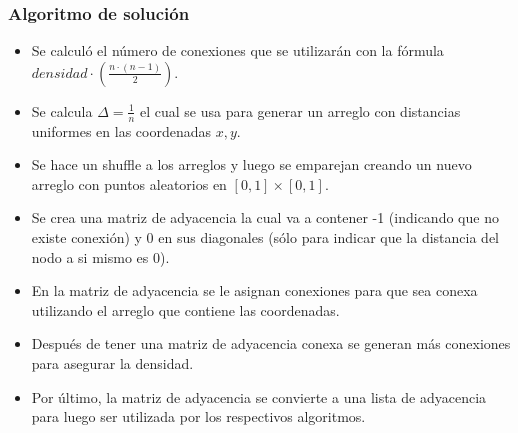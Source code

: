 \documentclass[letterpaper,11pt]{article}
\begin{document}
        \subsubsection{Algoritmo de solución}
            \begin{itemize}
                \item Se calculó el número de conexiones que se utilizarán con la fórmula $densidad \cdot (\frac{n \cdot (n-1)}{2})$.
                \item Se calcula $\Delta = \frac{1}{n}$ el cual se usa para generar un arreglo con distancias uniformes en las coordenadas $x,y$.
                \item Se hace un shuffle a los arreglos y luego se emparejan creando un nuevo arreglo con puntos aleatorios en $[0,1] \times [0,1]$.
                \item Se crea una matriz de adyacencia la cual va a contener -1 (indicando que no existe conexión) y 0 en sus diagonales (sólo para indicar que la distancia del nodo a si mismo es 0).   
                \item En la matriz de adyacencia se le asignan conexiones para que sea conexa utilizando el arreglo que contiene las coordenadas.
                \item Después de tener una matriz de adyacencia conexa se generan más conexiones para asegurar la densidad.
                \item Por último, la matriz de adyacencia se convierte a una lista de adyacencia para luego ser utilizada por los respectivos algoritmos.
            \end{itemize}
\end{document}

